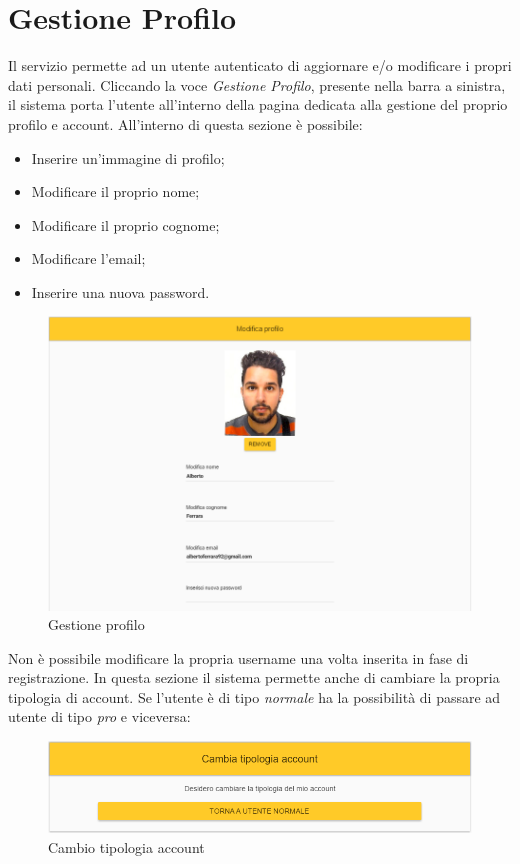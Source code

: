 \newpage
\section{Gestione Profilo}
Il servizio permette ad un utente autenticato di aggiornare e/o modificare i propri dati personali. Cliccando la voce \textit{Gestione Profilo}, presente nella barra a sinistra, il sistema porta l'utente all'interno della pagina dedicata alla gestione del proprio profilo e account. All'interno di questa sezione è possibile:
\begin{itemize}
	\item Inserire un'immagine di profilo;
	\item Modificare il proprio nome;
	\item Modificare il proprio cognome;
	\item Modificare l'email;
	\item Inserire una nuova password.
\end{itemize}

\label{GestioneProfilo}
\begin{figure}[ht]
	\centering
	\includegraphics[scale=0.50]{img/gestione_profilo.png}
	\caption{Gestione profilo}
\end{figure}
\FloatBarrier

Non è possibile modificare la propria username una volta inserita in fase di registrazione.
In questa sezione il sistema permette anche di cambiare la propria tipologia di account. Se l'utente è di tipo \textit{normale} ha la possibilità di passare ad utente di tipo \textit{pro} e viceversa:

\label{CambioTipologiaAccount}
\begin{figure}[ht]
	\centering
	\includegraphics[scale=0.50]{img/cambia_tipologia.png}
	\caption{Cambio tipologia account}
\end{figure}
\FloatBarrier

